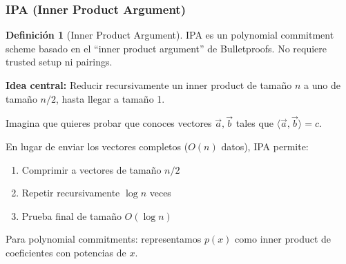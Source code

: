 \documentclass[11pt,a4paper,twoside,openright]{book}
\theoremstyle{definition}
\newtheorem{definition}{Definición}[chapter]
\theoremstyle{plain}
\theoremstyle{remark}
\begin{document}
\subsubsection{IPA (Inner Product Argument)}

\begin{definition}[Inner Product Argument]
IPA es un polynomial commitment scheme basado en el ``inner product argument'' de Bulletproofs. No requiere trusted setup ni pairings.

\textbf{Idea central:} Reducir recursivamente un inner product de tamaño $n$ a uno de tamaño $n/2$, hasta llegar a tamaño 1.
\end{definition}

\begin{intuicion}
Imagina que quieres probar que conoces vectores $\vec{a}, \vec{b}$ tales que $\langle \vec{a}, \vec{b} \rangle = c$.

En lugar de enviar los vectores completos ($O(n)$ datos), IPA permite:
\begin{enumerate}
    \item Comprimir a vectores de tamaño $n/2$
    \item Repetir recursivamente $\log n$ veces
    \item Prueba final de tamaño $O(\log n)$
\end{enumerate}

Para polynomial commitments: representamos $p(x)$ como inner product de coeficientes con potencias de $x$.
\end{intuicion}
\end{document}
